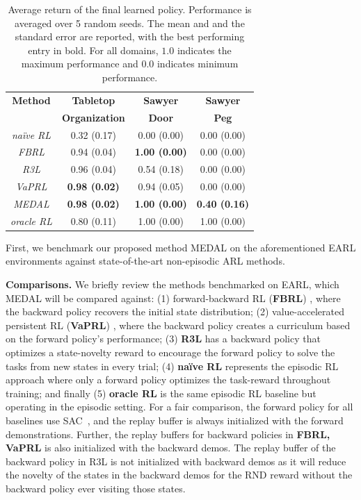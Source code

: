 \documentclass[nohyperref]{article}
\theoremstyle{plain}
\theoremstyle{definition}
\theoremstyle{remark}
\begin{document}
\begin{table}[t]
    \label{table:transfer results}
    \centering
    \begin{tabular}{@{}c|ccc@{}}
     \toprule
     \textbf{Method} & \textbf{Tabletop} & \textbf{Sawyer} & \textbf{Sawyer}\\
     & \textbf{Organization} & \textbf{Door} &\textbf{Peg}\\
        \midrule
    \emph{na\"{i}ve RL} & 0.32 (0.17) & 0.00 (0.00) & 0.00 (0.00)\\
    \emph{FBRL}         & 0.94 (0.04) & \textbf{1.00 (0.00)} & 0.00 (0.00)\\
    \emph{R3L}          & 0.96 (0.04) & 0.54 (0.18) & 0.00 (0.00)\\
    \emph{VaPRL}        & \textbf{0.98 (0.02)} & 0.94 (0.05) & 0.00 (0.00)\\
    \emph{MEDAL}        & \textbf{0.98 (0.02)} & \textbf{1.00 (0.00)} & \textbf{0.40 (0.16)}\\
    \hline
    \emph{oracle RL}    & 0.80 (0.11) & 1.00 (0.00) & 1.00 (0.00)\\
    \bottomrule
    \end{tabular}
  \caption{Average return of the final learned policy. Performance is averaged over 5 random seeds. The mean and and the standard error are reported, with the best performing entry in bold. For all domains, $1.0$ indicates the maximum performance and $0.0$ indicates minimum performance.}
\end{table}

First, we benchmark our proposed method MEDAL on the aforementioned EARL environments against state-of-the-art non-episodic ARL methods.

\textbf{Comparisons.} We briefly review the methods benchmarked on EARL, which MEDAL will be compared against: (1) forward-backward RL (\textbf{FBRL}) \citep{han2015learning, eysenbach2017leave}, where the backward policy recovers the initial state distribution; (2) value-accelerated persistent RL (\textbf{VaPRL}) \citep{sharma2021autonomouscurr}, where the backward policy creates a curriculum based on the forward policy's performance; (3) \textbf{R3L} \citep{zhu20ingredients} has a backward policy that optimizes a state-novelty reward \citep{burda2018exploration} to encourage the forward policy to solve the tasks from new states in every trial; (4) \textbf{na\"ive RL} represents the episodic RL approach where only a forward policy optimizes the task-reward throughout training; and finally (5) \textbf{oracle RL} is the same episodic RL baseline but operating in the episodic setting. For a fair comparison, the forward policy for all baselines use SAC~\citep{haarnoja2018soft}, and the replay buffer is always initialized with the forward demonstrations. Further, the replay buffers for backward policies in \textbf{FBRL, VaPRL} is also initialized with the backward demos. The replay buffer of the backward policy in R3L is not initialized with backward demos as it will reduce the novelty of the states in the backward demos for the RND reward without the backward policy ever visiting those states.
\end{document}
